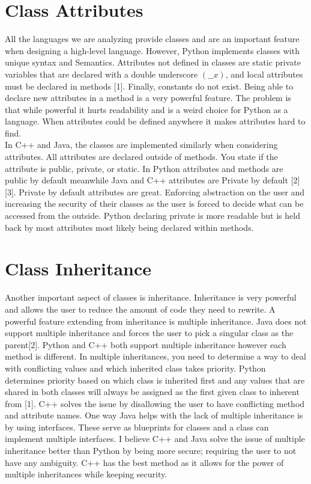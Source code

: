 \documentclass[sigconf, nonacm, authorversion, language=english, 12pt]{acmart}
\def\tab{\hspace*{5mm}}
\begin{document}
\section{Class Attributes}

\tab All the languages we are analyzing provide classes and are an important feature when designing a high-level language. However, Python implements classes with unique
syntax and Semantics. Attributes not defined in classes are static private variables that are declared with a double underscore $(\_\_x)$, and local
attributes must be declared in methods [1]. Finally, constants do not exist. Being able to declare new attributes in a method is a very powerful feature.
The problem is that while powerful it hurts readability and is a weird choice for Python as a language. When attributes could be defined anywhere it makes attributes hard to find.\\

\tab In C++ and Java, the classes are implemented similarly when considering attributes. All attributes are declared outside of methods. You state if the attribute is public, private, or static.
In Python attributes and methods are public by default meanwhile Java and C++ attributes are Private by default [2][3]. Private by default attributes are great. Enforcing abstraction on the user and
increasing the security of their classes as the user is forced to decide what can be accessed from the outside. Python declaring private is more readable but is held back by most attributes
most likely being declared within methods.\\

\section{Class Inheritance}

\tab Another important aspect of classes is inheritance. Inheritance is very powerful and allows the user to reduce the amount of code they need to rewrite. A powerful feature extending from
inheritance is multiple inheritance. Java does not support multiple inheritance and forces the user to pick a singular class as the parent[2]. Python and C++ both support multiple inheritance
however each method is different. In multiple inheritances, you need to determine a way to deal with conflicting values and which inherited class takes priority. Python determines priority based
on which class is inherited first and any values that are shared in both classes will always be assigned as the first given class to inherent from [1]. C++ solves the issue by disallowing the user to have conflicting
method and attribute names. One way Java helps with the lack of multiple inheritance is by using interfaces. These serve as blueprints for classes and a class can implement multiple interfaces.
I believe C++ and Java solve the issue of multiple inheritance better than Python by being more secure; requiring the user to not have any ambiguity. C++ has the best method as it allows for the power of
multiple inheritances while keeping security.\\
\end{document}
